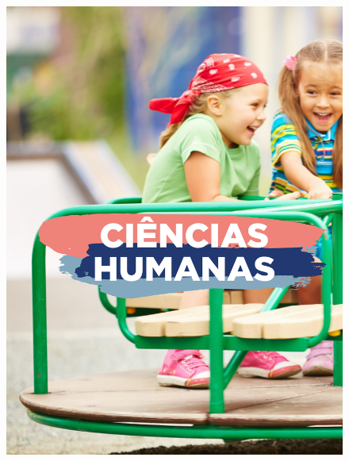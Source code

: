 \begin{figure}[htpb]
\vspace*{-2.5cm}
\hspace*{-2.5cm}\includegraphics[height=\paperheight]{../separadores/separadorCHU5A.png}
\end{figure}
\pagebreak

